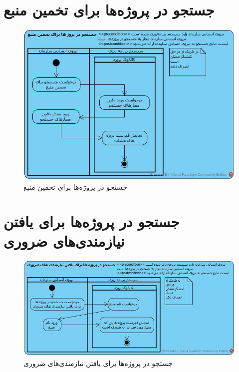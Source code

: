 \section{جستجو در پروژه‌ها برای تخمین منبع}
\begin{figure}[H]
	\centering
	\includegraphics[scale=0.8]{img/activity/SearchInProjects}
	\caption{جستجو در پروژه‌ها برای تخمین منبع}
\end{figure}

\section{جستجو در پروژه‌ها برای یافتن نیازمندی‌های ضروری}
\begin{figure}[H]
	\centering
	\includegraphics[scale=0.7]{img/activity/SearchForEssentialRequirements}
	\caption{جستجو در پروژه‌ها برای یافتن نیازمندی‌های ضروری}
\end{figure}


